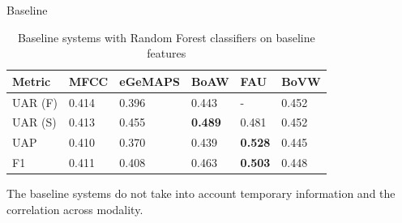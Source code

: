\documentclass{beamer}
\begin{document}
\begin{frame}{Baseline}

\begin{table}[htb]
    \small
    \centering
    \caption{Baseline systems with Random Forest classifiers on baseline features}
    \begin{tabular}{l|p{1.5cm}|p{1.9cm}|p{1.5cm}|p{1.5cm}|p{1.5cm}}
    \hline
    \hline
         Metric  & MFCC  & eGeMAPS & BoAW & FAU  & BoVW \\
         \hline
         UAR (F) & 0.414 & 0.396 & 0.443 & -     & 0.452 \\
         UAR (S) & 0.413 & 0.455 & \textbf{0.489} & 0.481 & 0.452 \\
         UAP     & 0.410 & 0.370 & 0.439 & \textbf{0.528} & 0.445 \\
         F1      & 0.411 & 0.408 & 0.463 & \textbf{0.503} & 0.448 \\
    \hline
    \hline
    \end{tabular}
    \label{tab:baseline}
\end{table}

The baseline systems do not take into account temporary information and the correlation across modality.

\end{frame}
\end{document}
